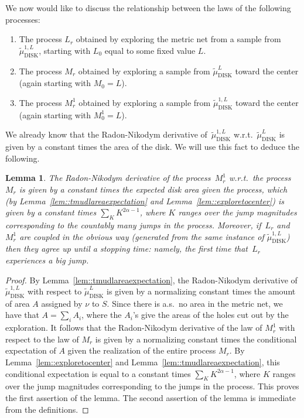 \documentclass[JEP,XML,SOM,Unicode]{cedram}
\theoremstyle{plain}
\numberwithin{theorem}{section}
\newtheorem{lemma}[theorem]{Lemma}
\theoremstyle{definition}
\newcommand{\tmudonel}{\wt{\mu}_{ \mathrm{DISK}}^{1, L}}
\newcommand{\tmudl}{\wt{\mu}_{\mathrm{DISK}}^L}
\let\wt\widetilde
\begin{document}
We now would like to discuss the relationship between the laws of the following processes:
\begin{enumerate} \item The process $L_r$ obtained by exploring the metric net from a sample from $\tmudonel$, starting with $L_0$ equal to some fixed value $L$.
\item The process $M_r$ obtained by exploring a sample from $\tmudl$ toward the center (again starting with $M_0 = L$).
\item The process $M_r^1$ obtained by exploring a sample from $\tmudonel$ toward the center (again starting with $M_0^1 = L$).
\end{enumerate}

We already know that the Radon-Nikodym derivative of~$\tmudonel$ w.r.t.\ $\tmudl$ is given by a constant times the area of the disk. We will use this fact to deduce the following.

\begin{lemma}
\label{lem::explorationprocessrelationships}
The Radon-Nikodym derivative of the process~$M_r^1$ w.r.t.\ the process~$M_r$ is given by a constant times the \emph{expected} disk area given the process, which (by Lemma~\ref{lem::tmudlareaexpectation} and Lemma~\ref{lem::exploretocenter}) is given by a constant times $\sum_K K^{2\alpha - 1}$, where $K$ ranges over the jump magnitudes corresponding to the countably many jumps in the process. Moreover, if~$L_r$ and~$M_r^1$ are coupled in the obvious way (\ie generated from the same instance of $\tmudonel$) then they agree up until a stopping time: namely, the first time that~$L_r$ experiences a big jump.
\end{lemma}
\begin{proof}
By Lemma~\ref{lem::tmudlareaexpectation}, the Radon-Nikodym derivative of $\tmudonel$ with respect to $\tmudl$ is given by a normalizing constant times the amount of area $A$ assigned by $\nu$ to $S$. Since there is a.s.\ no area in the metric net, we have that $A = \sum_i A_i$, where the $A_i$'s give the areas of the holes cut out by the exploration. It follows that the Radon-Nikodym derivative of the law of $M_r^1$ with respect to the law of $M_r$ is given by a normalizing constant times the conditional expectation of $A$ given the realization of the entire process $M_r$. By Lemma~\ref{lem::exploretocenter} and Lemma~\ref{lem::tmudlareaexpectation}, this conditional expectation is equal to a constant times $\sum_K K^{2\alpha-1}$, where $K$ ranges over the jump magnitudes corresponding to the jumps in the process. This proves the first assertion of the lemma. The second assertion of the lemma is immediate from the definitions.
\end{proof}
\end{document}
